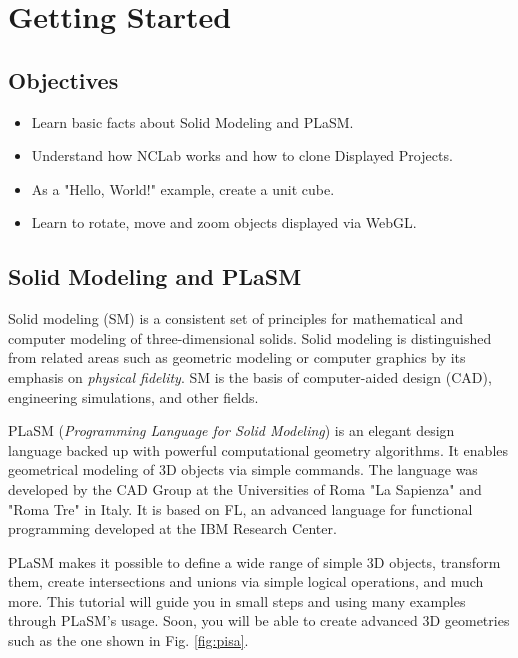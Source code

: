 \documentclass{article}
\begin{document}
\newpage
\setcounter{tocdepth}{2}
\tableofcontents

\newpage

\pagestyle{plain}
\setcounter{page}{1}


\newpage

\pagestyle{plain}
\setcounter{page}{1}

\section{Getting Started}

\subsection{Objectives}
\begin{itemize}
\item Learn basic facts about Solid Modeling and PLaSM.
\item Understand how NCLab works and how to clone Displayed Projects.
\item As a "Hello, World!" example, create a unit cube.
\item Learn to rotate, move and zoom objects displayed via WebGL.
\end{itemize}

\subsection{Solid Modeling and PLaSM}

Solid modeling (SM) is a consistent set of principles for mathematical and computer 
modeling of three-dimensional solids. Solid modeling is distinguished from related 
areas such as geometric modeling or computer graphics by its emphasis on {\em physical fidelity}.
SM is the basis of computer-aided design (CAD), engineering simulations, and other fields.

PLaSM ({\em Programming Language for Solid Modeling}) is an elegant design 
language backed up with powerful computational geometry algorithms. It 
enables geometrical modeling of 3D objects via simple commands.
The language was developed by the CAD Group at the Universities of Roma 
"La Sapienza" and "Roma Tre" in Italy. It is based on FL, an advanced 
language for functional programming developed at the IBM Research Center.

PLaSM makes it possible to define a wide range of simple 3D objects, transform 
them, create intersections and unions via simple logical operations, and much 
more. This tutorial will guide you in small steps and using many examples
through PLaSM's usage. Soon, you will be able to create advanced 
3D geometries such as the one shown in Fig. \ref{fig:pisa}.
\end{document}
